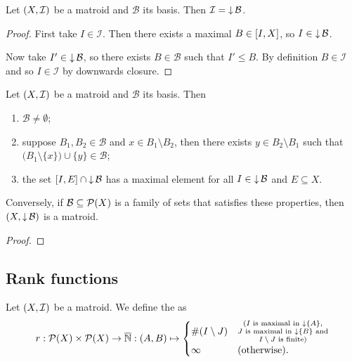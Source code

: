 \begin{lemma}
Let $\left( X,\mathcal{I} \right)$ be a matroid and $\mathcal{B}$ its basis. Then $\mathcal{I} = \operatorname{\downarrow} \mathcal{B}$.
\end{lemma}
\begin{proof}
First take $I\in \mathcal{I}$. Then there exists a maximal $B\in \interval{I, X}$, so $I\in \operatorname{\downarrow} \mathcal{B}$.

Now take $I'\in \operatorname{\downarrow} \mathcal{B}$, so there exists $B\in \mathcal{B}$ such that $I'\leq B$. By definition $B\in \mathcal{I}$ and so $I\in \mathcal{I}$ by downwards closure.
\end{proof}

\begin{proposition}
Let $\left( X,\mathcal{I} \right)$ be a matroid and $\mathcal{B}$ its basis. Then
\begin{enumerate}
\item $\mathcal{B} \neq \emptyset$;
\item suppose $B_1,B_2\in \mathcal{B}$ and $x\in B_1\setminus B_2$, then there exists $y\in B_2\setminus B_1$ such that $\big(B_1\setminus\{x\}\big)\cup \{y\}\in \mathcal{B}$;
\item the set $\interval{I, E}\cap \downset\mathcal{B}$ has a maximal element for all $I\in \operatorname{\downarrow} \mathcal{B}$ and $E\subseteq X$.
\end{enumerate}
Conversely, if $\mathcal{B}\subseteq \operatorname{\mathcal{P}}(X)$ is a family of sets that satisfies these properties, then $\left( X, \operatorname{\downarrow} \mathcal{B} \right)$ is a matroid.
\end{proposition}
\begin{proof}

\end{proof}


\subsection{Rank functions}
\begin{definition}
Let $\left( X,\mathcal{I} \right)$ be a matroid. We define the  as
\[ r: \operatorname{\mathcal{P}}(X)\times \operatorname{\mathcal{P}}(X) \to \overline{\mathbb{N}}: (A, B) \mapsto \begin{cases}
\#(I\setminus J) & \substack{(\text{$I$ is maximal in $\operatorname{\downarrow}\{A\}$}, \\ \text{$J$ is maximal in $\operatorname{\downarrow}\{B\}$ and} \\ \text{$I\setminus J$ is finite})} \\
\infty & (\text{otherwise}).
\end{cases} \]
\end{definition}

